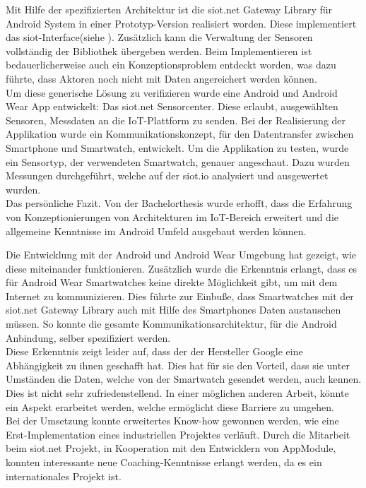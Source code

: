Mit Hilfe der spezifizierten Architektur ist die siot.net Gateway Library für Android System in einer Prototyp-Version realisiert worden. Diese implementiert das siot-Interface(siehe \cite{siot:cobo}). Zusätzlich kann die Verwaltung der Sensoren vollständig der Bibliothek übergeben werden. Beim Implementieren ist bedauerlicherweise auch ein Konzeptionsproblem entdeckt worden, was dazu führte, dass Aktoren noch nicht mit Daten angereichert werden können.\\

Um diese generische Lösung zu verifizieren wurde eine Android und Android Wear App entwickelt: Das siot.net Sensorcenter. Diese erlaubt, ausgewählten Sensoren, Messdaten an die \gls{IoT}-Plattform zu senden. Bei der Realisierung der Applikation wurde ein Kommunikationskonzept, für den Datentransfer zwischen Smartphone und Smartwatch, entwickelt. Um die Applikation zu testen, wurde ein Sensortyp, der verwendeten Smartwatch, genauer angeschaut. Dazu wurden Messungen durchgeführt, welche auf der siot.io analysiert und ausgewertet wurden.\\

Das persönliche Fazit. Von der Bachelorthesis wurde erhofft, dass die Erfahrung von Konzeptionierungen von Architekturen im \gls{IoT}-Bereich erweitert und die allgemeine Kenntnisse im Android Umfeld ausgebaut werden können.

Die Entwicklung mit der Android und Android Wear Umgebung hat gezeigt, wie diese miteinander funktionieren. Zusätzlich wurde die Erkenntnis erlangt, dass es für Android Wear Smartwatches keine direkte Möglichkeit gibt, um mit dem Internet zu kommunizieren. Dies führte zur Einbuße, dass Smartwatches mit der siot.net Gateway Library auch mit Hilfe des Smartphones Daten austauschen müssen. So konnte die gesamte Kommunikationsarchitektur, für die Android Anbindung, selber spezifiziert werden.\\

Diese Erkenntnis zeigt leider auf, dass der der Hersteller Google eine Abhängigkeit zu ihnen geschafft hat. Dies hat für sie den Vorteil, dass sie unter Umständen die Daten, welche von der Smartwatch gesendet werden, auch kennen. Dies ist nicht sehr zufriedenstellend. In einer möglichen anderen Arbeit, könnte ein Aspekt erarbeitet werden, welche ermöglicht diese Barriere zu umgehen.\\

Bei der Umsetzung konnte erweitertes Know-how gewonnen werden, wie eine Erst-Implementation eines industriellen Projektes verläuft. Durch die Mitarbeit beim siot.net Projekt, in Kooperation mit den Entwicklern von AppModule, konnten interessante neue Coaching-Kenntnisse erlangt werden, da es ein internationales Projekt ist.\\

